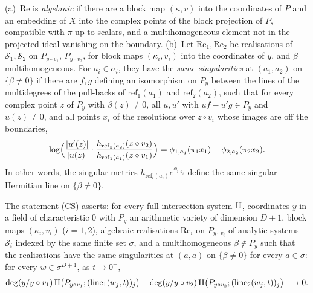 \begin{definition}\label{pf:tower:def-samesing}
(a)~$\mathrm{Re}$ is \emph{algebraic} if there are a block map $(\kappa,v)$ into the coordinates of $P$ and an embedding of
$X$ into the complex points of the block projection of $P$, compatible with $\pi$ up to scalars, and a multihomogeneous
element not in the projected ideal vanishing on the boundary.
(b)~Let $\mathrm{Re}_1,\mathrm{Re}_2$ be realisations of $\mathcal S_1,\mathcal S_2$ on $P_{y\circ v_1}$, $P_{y\circ v_2}$,
for block maps $(\kappa_i,v_i)$ into the coordinates of $y$, and $\beta$ multihomogeneous. For $a_i\in\sigma_i$, they have
the \emph{same singularities} at $(a_1,a_2)$ on $\{\beta\ne0\}$ if there are $f,g$ defining an isomorphism on $P_y$ between
the lines of the multidegrees of the pull-backs of $\mathrm{ref}_1(a_1)$ and $\mathrm{ref}_2(a_2)$, such that for every
complex point $z$ of $P_y$ with $\beta(z)\ne0$, all $u,u'$ with $uf-u'g\in P_y$ and $u(z)\ne0$, and all points $x_i$ of the
resolutions over $z\circ v_i$ whose images are off the boundaries,
\[
\log\Bigl(\frac{|u'(z)|}{|u(z)|}\cdot\frac{h_{\mathrm{ref}_2(a_2)}(z\circ v_2)}{h_{\mathrm{ref}_1(a_1)}(z\circ v_1)}\Bigr)
=\phi_{1,a_1}(\pi_1x_1)-\phi_{2,a_2}(\pi_2x_2).
\]
In other words, the singular metrics $h_{\mathrm{ref}_i(a_i)}e^{\phi_{i,a_i}}$ define the same singular Hermitian line on
$\{\beta\ne0\}$.
\end{definition}

\begin{definition}\label{pf:tower:def-cs}
The statement (CS) asserts: for every full intersection system $\mathrm{II}$, coordinates $y$ in a field of characteristic $0$
with $P_y$ an arithmetic variety of dimension $D+1$, block maps $(\kappa_i,v_i)$ ($i=1,2$), algebraic realisations
$\mathrm{Re}_i$ on $P_{y\circ v_i}$ of analytic systems $\mathcal S_i$ indexed by the same finite set $\sigma$, and a
multihomogeneous $\beta\notin P_y$ such that the realisations have the same singularities at $(a,a)$ on $\{\beta\ne0\}$
for every $a\in\sigma$: for every $w\in\sigma^{D+1}$, as $t\to0^+$,
\[
\deg(y/y\circ v_1)\,\mathrm{II}\bigl(P_{y\circ v_1};(\mathrm{line}_1(w_j,t))_j\bigr)
-\deg(y/y\circ v_2)\,\mathrm{II}\bigl(P_{y\circ v_2};(\mathrm{line}_2(w_j,t))_j\bigr)\longrightarrow0.
\]
\end{definition}

